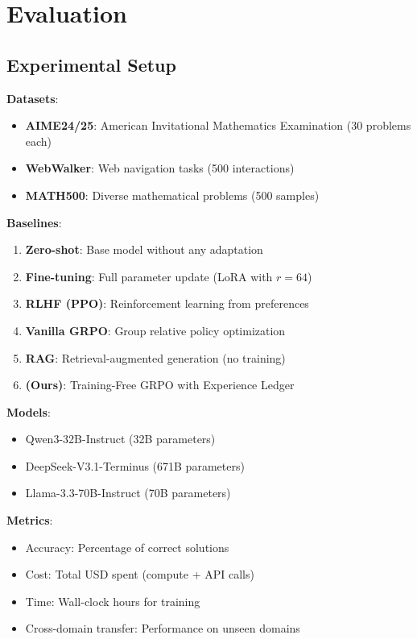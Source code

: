 \section{Evaluation}

\label{sec:evaluation}

\subsection{Experimental Setup}

\textbf{Datasets}:
\begin{itemize}
    \item \textbf{AIME24/25}: American Invitational Mathematics Examination (30 problems each)
    \item \textbf{WebWalker}: Web navigation tasks (500 interactions)
    \item \textbf{MATH500}: Diverse mathematical problems (500 samples)
\end{itemize}

\textbf{Baselines}:
\begin{enumerate}
    \item \textbf{Zero-shot}: Base model without any adaptation
    \item \textbf{Fine-tuning}: Full parameter update (LoRA with $r=64$)
    \item \textbf{RLHF (PPO)}: Reinforcement learning from preferences
    \item \textbf{Vanilla GRPO}: Group relative policy optimization
    \item \textbf{RAG}: Retrieval-augmented generation (no training)
    \item \textbf{\DSO{} (Ours)}: Training-Free GRPO with Experience Ledger
\end{enumerate}

\textbf{Models}:
\begin{itemize}
    \item Qwen3-32B-Instruct (32B parameters)
    \item DeepSeek-V3.1-Terminus (671B parameters)
    \item Llama-3.3-70B-Instruct (70B parameters)
\end{itemize}

\textbf{Metrics}:
\begin{itemize}
    \item Accuracy: Percentage of correct solutions
    \item Cost: Total USD spent (compute + API calls)
    \item Time: Wall-clock hours for training
    \item Cross-domain transfer: Performance on unseen domains
\end{itemize}

